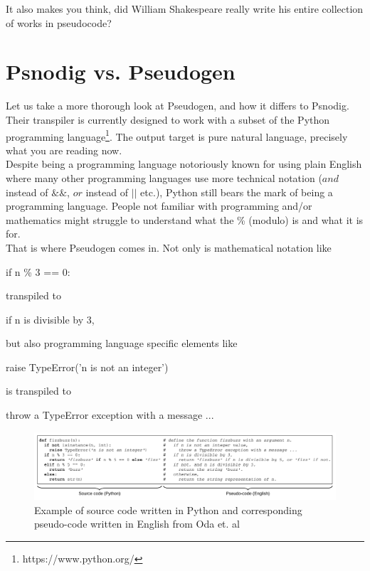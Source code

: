 It also makes you think, did William Shakespeare really write his entire collection of works in pseudocode?

\section{Psnodig vs. Pseudogen}

Let us take a more thorough look at Pseudogen, and how it differs to Psnodig. Their transpiler is currently designed to work with a subset of the Python programming language\footnote{https://www.python.org/}. The output target is pure natural language, precisely what you are reading now. \hfill \\

Despite being a programming language notoriously known for using plain English where many other programming languages use more technical notation ($and$ instead of $\&\&$, $or$ instead of $||$ etc.), Python still bears the mark of being a programming language. People not familiar with programming and/or mathematics might struggle to understand what the \% (modulo) is and what it is for. \hfill \\

That is where Pseudogen comes in. Not only is mathematical notation like

\begin{displayquote}
    if n \% 3 == 0:
\end{displayquote}

transpiled to

\begin{displayquote}
    if n is divisible by 3,
\end{displayquote}

but also programming language specific elements like

\begin{displayquote}
    raise TypeError('n is not an integer')
\end{displayquote}

is transpiled to

\begin{displayquote}
    throw a TypeError exception with a message ...
\end{displayquote}

\begin{figure}[ht]
    \centering
    \includegraphics[scale=0.52]{assets/odaetal.png}
    \caption{Example of source code written in Python and corresponding pseudo-code written in English from Oda et. al}
    \label{fig:odaetal}
\end{figure}

